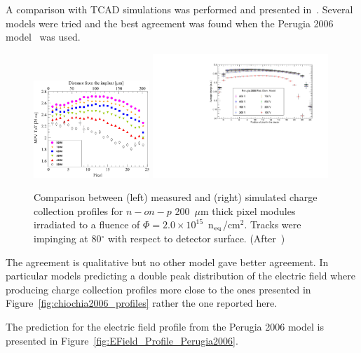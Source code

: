 A comparison with TCAD simulations was performed and presented in~\cite{bomben_rd50_Santander}. 
Several models were tried and the best agreement was found when the Perugia 2006 model~\cite{Moscatelli-2006} was used.
\begin{figure}[!htpb]
\centering
\includegraphics[width=0.39\textwidth]{Savic_high_phi.jpg}
\includegraphics[width=0.59\textwidth]{Pixel_Profile_Perugia2006.pdf}
\caption{\label{fig:Pixel_Profile_Perugia2006}Comparison between (left) measured and (right) 
simulated charge collection profiles for $n-on-p$ 200~$\mu$m thick  pixel modules irradiated to a fluence of 
$\Phi = 2.0\times10^{15}$~n$_{\rm eq}$/cm$^2$. Tracks were impinging at 80$^{\circ}$ with 
respect to detector surface. (After~\cite{Macchiolo:2016xzi,bomben_rd50_Santander})}
\end{figure}
The agreement is qualitative but no other model gave better agreement. In particular models 
predicting a double peak distribution of the electric field where producing charge collection profiles 
more close to the ones presented in Figure~\ref{fig:chiochia2006_profiles} rather the one 
reported here. 

The prediction for the electric field profile from the Perugia 2006 model is presented in 
Figure~\ref{fig:EField_Profile_Perugia2006}.

